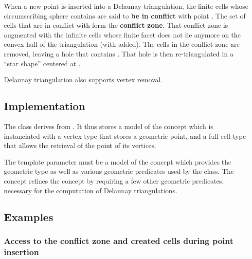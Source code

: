 
When a new point  is inserted into a Delaunay triangulation, the
finite cells whose circumscribing sphere contains  are said to
\textbf{be in conflict} with point . The set of cells that are in
conflict with  form the \textbf{conflict zone}. That conflict zone is
augmented with the infinite cells whose finite facet does not lie
anymore on the convex hull of the triangulation (with  added). The cells
in the conflict zone are removed, leaving a hole that contains . That
hole is then re-triangulated in a ``star shape'' centered at .

Delaunay triangulation also supports vertex removal.


\subsection{Implementation}

The class  derives from
. It thus stores a model  of
the concept  which is instanciated with a vertex
type that stores a geometric point, and a full cell type that allows the
retrieval of the point of its vertices.

The template parameter  must be a model of the concept
 which provides the geometric  type as
well as various geometric predicates used by the  class.
The concept  refines the concept
 by requiring a few other geometric predicates, necessary
for the computation of Delaunay triangulations.


\subsection{Examples}

\subsubsection{Access to the conflict zone and created cells during point
insertion}

